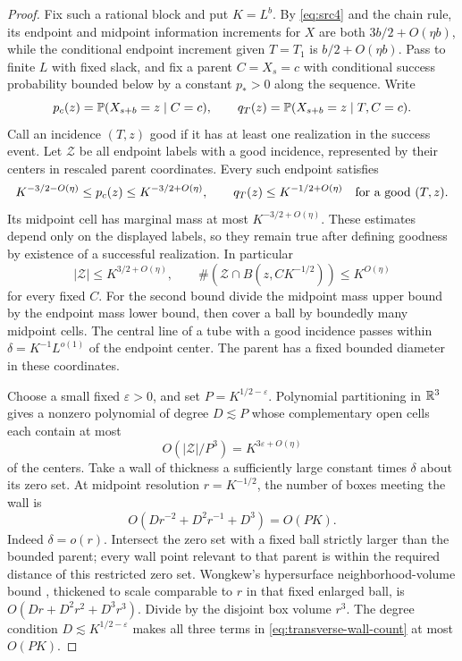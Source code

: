 \begin{proof}
Fix such a rational block and put $K=L^b$.  By
\eqref{eq:src4} and the chain rule, its endpoint and midpoint
information increments for $X$ are both $3b/2+O(\eta b)$, while
the conditional endpoint increment given $T=T_1$ is
$b/2+O(\eta b)$.  Pass to finite $L$ with fixed slack, and fix a
parent $C=X_s=c$ with conditional success probability bounded below
by a constant $p_*>0$ along the sequence.  Write
\[
 p_c(z)=\mathbb P(X_{s+b}=z\mid C=c),\qquad
 q_T(z)=\mathbb P(X_{s+b}=z\mid T,C=c).
\]
Call an incidence $(T,z)$ good if it has at least one realization
in the success event.  Let $\mathcal Z$ be all endpoint labels with
a good incidence, represented by their centers in rescaled parent
coordinates.  Every such endpoint satisfies
\begin{equation}\label{eq:transverse-good-masses}
 K^{-3/2-O(\eta)}\le p_c(z)\le K^{-3/2+O(\eta)},
 \qquad q_T(z)\le K^{-1/2+O(\eta)}
       \quad\hbox{for a good }(T,z).
\end{equation}
Its midpoint cell has marginal mass at most
$K^{-3/2+O(\eta)}$.  These estimates depend only on the displayed
labels, so they remain true after defining goodness by existence
of a successful realization.  In particular
\begin{equation}\label{eq:transverse-good-counts}
 |\mathcal Z|\le K^{3/2+O(\eta)},\qquad
 \#(\mathcal Z\cap B(z,CK^{-1/2}))\le K^{O(\eta)}
\end{equation}
for every fixed $C$.  For the second bound divide the midpoint
mass upper bound by the endpoint mass lower bound, then cover a
ball by boundedly many midpoint cells.  The central line of a tube
with a good incidence passes within
$\delta=K^{-1}L^{o(1)}$ of the endpoint center.  The parent has a
fixed bounded diameter in these coordinates.

Choose a small fixed $\varepsilon>0$, and set
$P=K^{1/2-\varepsilon}$.  Polynomial partitioning in $\mathbb R^3$
\cite[Theorem~4.1]{GK15} gives a nonzero polynomial of degree
$D\lesssim P$ whose complementary open cells each contain at most
\begin{equation}\label{eq:transverse-partition-occupancy}
 O(|\mathcal Z|/P^3)=K^{3\varepsilon+O(\eta)}
\end{equation}
of the centers.  Take a wall of thickness a sufficiently large
constant times $\delta$ about its zero set.  At midpoint resolution
$r=K^{-1/2}$, the number of boxes meeting the wall is
\begin{equation}\label{eq:transverse-wall-count}
 O(Dr^{-2}+D^2r^{-1}+D^3)=O(PK).
\end{equation}
Indeed $\delta=o(r)$.  Intersect the zero set with a fixed ball
strictly larger than the bounded parent; every wall point relevant
to that parent is within the required distance of this restricted
zero set.  Wongkew's hypersurface neighborhood-volume bound
\cite[Main Theorem, p.~178]{W93}, thickened to scale comparable to $r$ in that fixed
enlarged ball, is
$O(Dr+D^2r^2+D^3r^3)$.  Divide by the disjoint box volume $r^3$.
The degree condition $D\lesssim K^{1/2-\varepsilon}$ makes all
three terms in \eqref{eq:transverse-wall-count} at most $O(PK)$.


\end{proof}
